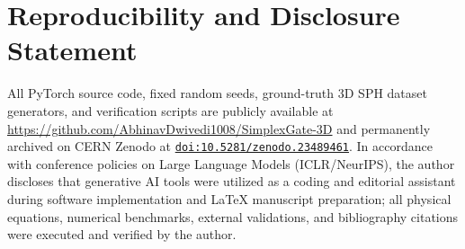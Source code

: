 \documentclass[10pt,twocolumn,letterpaper]{article}
\begin{document}
\section*{Reproducibility and Disclosure Statement}
\small
All PyTorch source code, fixed random seeds, ground-truth 3D SPH dataset generators, and verification scripts are publicly available at \url{https://github.com/AbhinavDwivedi1008/SimplexGate-3D} and permanently archived on CERN Zenodo at \href{https://doi.org/10.5281/zenodo.23489461}{\texttt{doi:10.5281/zenodo.23489461}}. In accordance with conference policies on Large Language Models (ICLR/NeurIPS), the author discloses that generative AI tools were utilized as a coding and editorial assistant during software implementation and LaTeX manuscript preparation; all physical equations, numerical benchmarks, external validations, and bibliography citations were executed and verified by the author.
\end{document}
